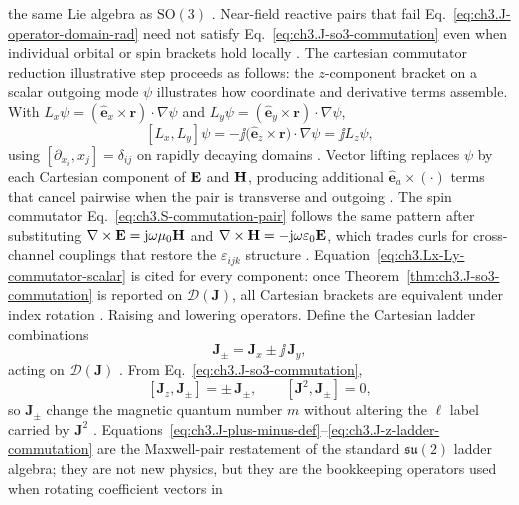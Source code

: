 the same Lie algebra as \(\mathrm{SO}(3)\) . Near-field reactive pairs that
fail Eq.~\eqref{eq:ch3.J-operator-domain-rad} need not satisfy Eq.~\eqref{eq:ch3.J-so3-commutation} even when
individual orbital or spin brackets hold locally .
The cartesian commutator reduction illustrative step proceeds as follows: the \(z\)-component bracket on a scalar outgoing mode \(\psi\) illustrates how coordinate and derivative terms
assemble. With \(L_x\psi=(\hat{\mathbf{e}}_x\times\mathbf{r})\cdot\nabla\psi\) and
\(L_y\psi=(\hat{\mathbf{e}}_y\times\mathbf{r})\cdot\nabla\psi\),
\begin{equation}
\label{eq:ch3.Lx-Ly-commutator-scalar}
[L_x,L_y]\psi
=
-\jj\big(\hat{\mathbf{e}}_z\times\mathbf{r}\big)\cdot\nabla\psi
=
\jj L_z\psi,
\end{equation}
using \([\partial_{x_i},x_j]=\delta_{ij}\) on rapidly decaying domains .
Vector lifting replaces \(\psi\) by each Cartesian component of \(\mathbf{E}\) and \(\mathbf{H}\), producing additional
\(\hat{\mathbf{e}}_a\times(\cdot)\) terms that cancel pairwise when the pair is transverse and outgoing
. The spin commutator Eq.~\eqref{eq:ch3.S-commutation-pair} follows the same pattern after
substituting \(\nabla\times\mathbf{E}=\mathrm{j}\omega\mu_0\mathbf{H}\) and \(\nabla\times\mathbf{H}=-\mathrm{j}\omega\varepsilon_0\mathbf{E}\), which trades
curls for cross-channel couplings that restore the \(\varepsilon_{ijk}\) structure .
Equation~\eqref{eq:ch3.Lx-Ly-commutator-scalar} is cited for every component: once
Theorem~\ref{thm:ch3.J-so3-commutation} is reported on \(\mathcal{D}(\mathbf{J})\), all Cartesian brackets are
equivalent under index rotation .
Raising and lowering operators. Define the Cartesian ladder combinations
\begin{equation}
\label{eq:ch3.J-plus-minus-def}
\mathbf{J}_{\pm}
=
\mathbf{J}_{x}\pm\jj\,\mathbf{J}_{y},
\end{equation}
acting on \(\mathcal{D}(\mathbf{J})\) . From
Eq.~\eqref{eq:ch3.J-so3-commutation},
\begin{equation}
\label{eq:ch3.J-z-ladder-commutation}
[\mathbf{J}_{z},\mathbf{J}_{\pm}]
=
\pm\,\mathbf{J}_{\pm},
\qquad
[\mathbf{J}^{2},\mathbf{J}_{\pm}]
=
0,
\end{equation}
so \(\mathbf{J}_{\pm}\) change the magnetic quantum number \(m\) without altering the \(\ell\) label carried
by \(\mathbf{J}^{2}\) . Equations~\eqref{eq:ch3.J-plus-minus-def}--\eqref{eq:ch3.J-z-ladder-commutation}
are the Maxwell-pair restatement of the standard \(\mathfrak{su}(2)\) ladder algebra; they are not new physics,
but they are the bookkeeping operators used when rotating coefficient vectors in
